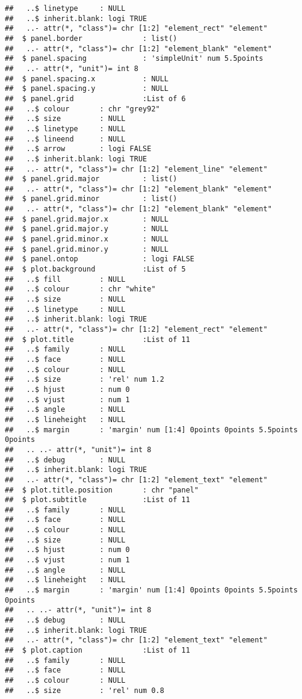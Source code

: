 \documentclass[
]{article}
\begin{document}
\begin{verbatim}
##   ..$ linetype     : NULL
##   ..$ inherit.blank: logi TRUE
##   ..- attr(*, "class")= chr [1:2] "element_rect" "element"
##  $ panel.border              : list()
##   ..- attr(*, "class")= chr [1:2] "element_blank" "element"
##  $ panel.spacing             : 'simpleUnit' num 5.5points
##   ..- attr(*, "unit")= int 8
##  $ panel.spacing.x           : NULL
##  $ panel.spacing.y           : NULL
##  $ panel.grid                :List of 6
##   ..$ colour       : chr "grey92"
##   ..$ size         : NULL
##   ..$ linetype     : NULL
##   ..$ lineend      : NULL
##   ..$ arrow        : logi FALSE
##   ..$ inherit.blank: logi TRUE
##   ..- attr(*, "class")= chr [1:2] "element_line" "element"
##  $ panel.grid.major          : list()
##   ..- attr(*, "class")= chr [1:2] "element_blank" "element"
##  $ panel.grid.minor          : list()
##   ..- attr(*, "class")= chr [1:2] "element_blank" "element"
##  $ panel.grid.major.x        : NULL
##  $ panel.grid.major.y        : NULL
##  $ panel.grid.minor.x        : NULL
##  $ panel.grid.minor.y        : NULL
##  $ panel.ontop               : logi FALSE
##  $ plot.background           :List of 5
##   ..$ fill         : NULL
##   ..$ colour       : chr "white"
##   ..$ size         : NULL
##   ..$ linetype     : NULL
##   ..$ inherit.blank: logi TRUE
##   ..- attr(*, "class")= chr [1:2] "element_rect" "element"
##  $ plot.title                :List of 11
##   ..$ family       : NULL
##   ..$ face         : NULL
##   ..$ colour       : NULL
##   ..$ size         : 'rel' num 1.2
##   ..$ hjust        : num 0
##   ..$ vjust        : num 1
##   ..$ angle        : NULL
##   ..$ lineheight   : NULL
##   ..$ margin       : 'margin' num [1:4] 0points 0points 5.5points 0points
##   .. ..- attr(*, "unit")= int 8
##   ..$ debug        : NULL
##   ..$ inherit.blank: logi TRUE
##   ..- attr(*, "class")= chr [1:2] "element_text" "element"
##  $ plot.title.position       : chr "panel"
##  $ plot.subtitle             :List of 11
##   ..$ family       : NULL
##   ..$ face         : NULL
##   ..$ colour       : NULL
##   ..$ size         : NULL
##   ..$ hjust        : num 0
##   ..$ vjust        : num 1
##   ..$ angle        : NULL
##   ..$ lineheight   : NULL
##   ..$ margin       : 'margin' num [1:4] 0points 0points 5.5points 0points
##   .. ..- attr(*, "unit")= int 8
##   ..$ debug        : NULL
##   ..$ inherit.blank: logi TRUE
##   ..- attr(*, "class")= chr [1:2] "element_text" "element"
##  $ plot.caption              :List of 11
##   ..$ family       : NULL
##   ..$ face         : NULL
##   ..$ colour       : NULL
##   ..$ size         : 'rel' num 0.8

\end{verbatim}
\end{document}
